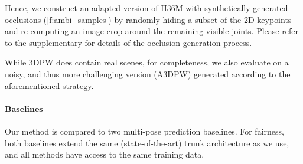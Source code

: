 Hence, we construct an adapted version of H36M with synthetically-generated occlusions (\cref{f:ambi_samples}) by randomly hiding a subset of the 2D keypoints and re-computing an image crop around the remaining visible joints. Please refer to the supplementary for details of the occlusion generation process.

While 3DPW does contain real scenes, for completeness, we also evaluate on a noisy, and thus more challenging version (A3DPW) generated according to the aforementioned strategy.





\paragraph{Baselines}\label{s:exp_baselines}

Our method is compared to two multi-pose prediction baselines. For fairness, both baselines extend the same (state-of-the-art) trunk architecture as we use, and all methods have access to the same training data. 

